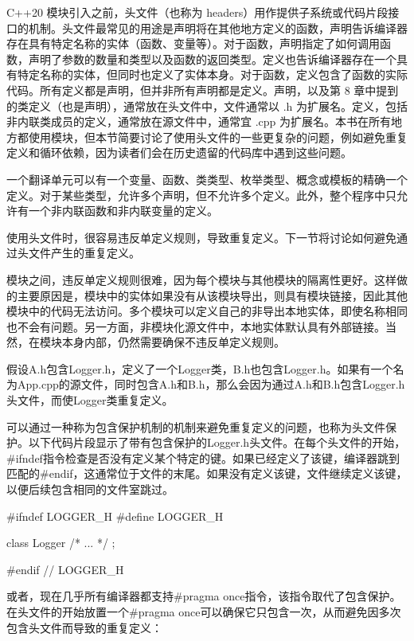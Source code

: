 
C++20 模块引入之前，头文件（也称为 headers）用作提供子系统或代码片段接口的机制。头文件最常见的用途是声明将在其他地方定义的函数，声明告诉编译器存在具有特定名称的实体（函数、变量等）。对于函数，声明指定了如何调用函数，声明了参数的数量和类型以及函数的返回类型。定义也告诉编译器存在一个具有特定名称的实体，但同时也定义了实体本身。对于函数，定义包含了函数的实际代码。所有定义都是声明，但并非所有声明都是定义。声明，以及第 8 章中提到的类定义（也是声明），通常放在头文件中，文件通常以 .h 为扩展名。定义，包括非内联类成员的定义，通常放在源文件中，通常宜 .cpp 为扩展名。本书在所有地方都使用模块，但本节简要讨论了使用头文件的一些更复杂的问题，例如避免重复定义和循环依赖，因为读者们会在历史遗留的代码库中遇到这些问题。


一个翻译单元可以有一个变量、函数、类类型、枚举类型、概念或模板的精确一个定义。对于某些类型，允许多个声明，但不允许多个定义。此外，整个程序中只允许有一个非内联函数和非内联变量的定义。

使用头文件时，很容易违反单定义规则，导致重复定义。下一节将讨论如何避免通过头文件产生的重复定义。

模块之间，违反单定义规则很难，因为每个模块与其他模块的隔离性更好。这样做的主要原因是，模块中的实体如果没有从该模块导出，则具有模块链接，因此其他模块中的代码无法访问。多个模块可以定义自己的非导出本地实体，即使名称相同也不会有问题。另一方面，非模块化源文件中，本地实体默认具有外部链接。当然，在模块本身内部，仍然需要确保不违反单定义规则。


假设A.h包含Logger.h，定义了一个Logger类，B.h也包含Logger.h。如果有一个名为App.cpp的源文件，同时包含A.h和B.h，那么会因为通过A.h和B.h包含Logger.h头文件，而使Logger类重复定义。

可以通过一种称为包含保护机制的机制来避免重复定义的问题，也称为头文件保护。以下代码片段显示了带有包含保护的Logger.h头文件。在每个头文件的开始，\#ifndef指令检查是否没有定义某个特定的键。如果已经定义了该键，编译器跳到匹配的\#endif，这通常位于文件的末尾。如果没有定义该键，文件继续定义该键，以便后续包含相同的文件室跳过。

\begin{cpp}
#ifndef LOGGER_H
#define LOGGER_H

class Logger { /* ... */ };

#endif // LOGGER_H
\end{cpp}

或者，现在几乎所有编译器都支持\#pragma once指令，该指令取代了包含保护。在头文件的开始放置一个\#pragma once可以确保它只包含一次，从而避免因多次包含头文件而导致的重复定义：

